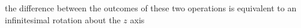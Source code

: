 the difference between the outcomes of these two operations is equivalent to an
infinitesimal rotation about the $z$ axis

